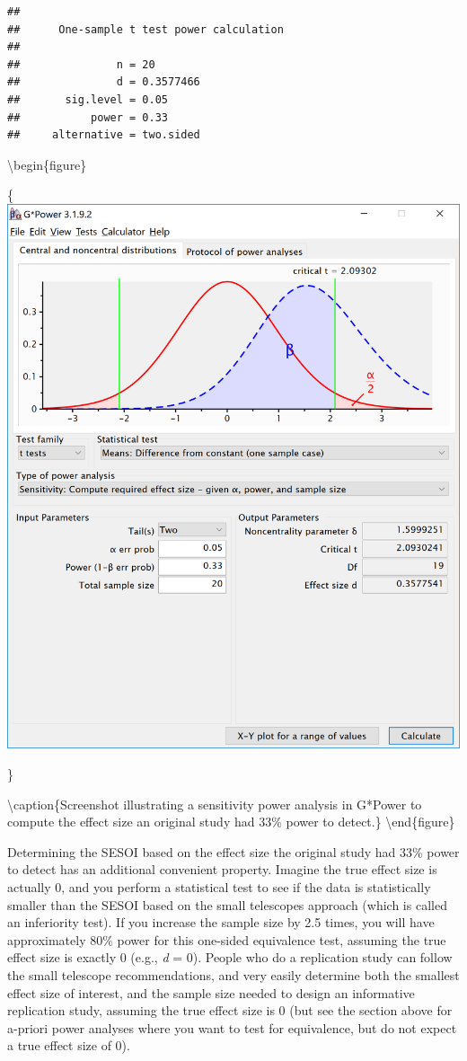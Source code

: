 \documentclass[
  oneside]{book}
\begin{document}
\begin{verbatim}
## 
##      One-sample t test power calculation 
## 
##               n = 20
##               d = 0.3577466
##       sig.level = 0.05
##           power = 0.33
##     alternative = two.sided
\end{verbatim}

\textbackslash begin\{figure\}

\{\centering \includegraphics[width=1\linewidth]{images/0deabffd850f7b63c16e41e0af9ae0b6}

\}

\textbackslash caption\{Screenshot illustrating a sensitivity power analysis in G*Power to compute the effect size an original study had 33\% power to detect.\}\label{fig:smalltelpower}
\textbackslash end\{figure\}

Determining the SESOI based on the effect size the original study had 33\% power to detect has an additional convenient property. Imagine the true effect size is actually 0, and you perform a statistical test to see if the data is statistically smaller than the SESOI based on the small telescopes approach (which is called an inferiority test). If you increase the sample size by 2.5 times, you will have approximately 80\% power for this one-sided equivalence test, assuming the true effect size is exactly 0 (e.g., \emph{d} = 0). People who do a replication study can follow the small telescope recommendations, and very easily determine both the smallest effect size of interest, and the sample size needed to design an informative replication study, assuming the true effect size is 0 (but see the section above for a-priori power analyses where you want to test for equivalence, but do not expect a true effect size of 0).
\end{document}
